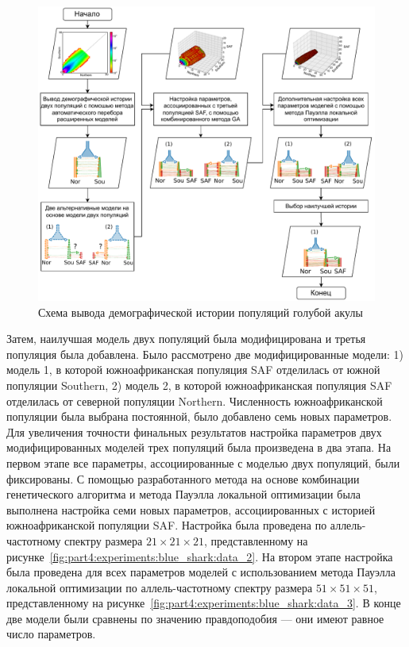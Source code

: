 \begin{figure}[ht]
    \centering
        \includegraphics[width=\linewidth]{images_experiments/blue_shark/blue_shark_scheme.drawio.pdf}
    \caption{Схема вывода демографической истории популяций голубой акулы}
    \label{fig:part2:experiments:blue_shark:scheme}
\end{figure}

Затем, наилучшая модель двух популяций была модифицирована и третья популяция была добавлена.
Было рассмотрено две модифицированные модели: 1) модель 1, в которой южноафриканская популяция SAF отделилась от южной популяции Southern, 2) модель 2, в которой южноафриканская популяция SAF отделилась от северной популяции Northern.
Численность южноафриканской популяции была выбрана постоянной, было добавлено семь новых параметров.
Для увеличения точности финальных результатов настройка параметров двух модифицированных моделей трех популяций была произведена в два этапа.
На первом этапе все параметры, ассоциированные с моделью двух популяций, были фиксированы.
С помощью разработанного метода на основе комбинации генетического алгоритма и метода Пауэлла локальной оптимизации была выполнена настройка семи новых параметров, ассоциированных с историей южноафриканской популяции SAF.
Настройка была проведена по аллель-частотному спектру размера $21\times21\times21$, представленному на рисунке~\ref{fig:part4:experiments:blue_shark:data_2}.
На втором этапе настройка была проведена для всех параметров моделей с использованием метода Пауэлла локальной оптимизации по аллель-частотному спектру размера $51\times51\times51$, представленному на рисунке~\ref{fig:part4:experiments:blue_shark:data_3}.
В конце две модели были сравнены по значению правдоподобия --- они имеют равное число параметров.

